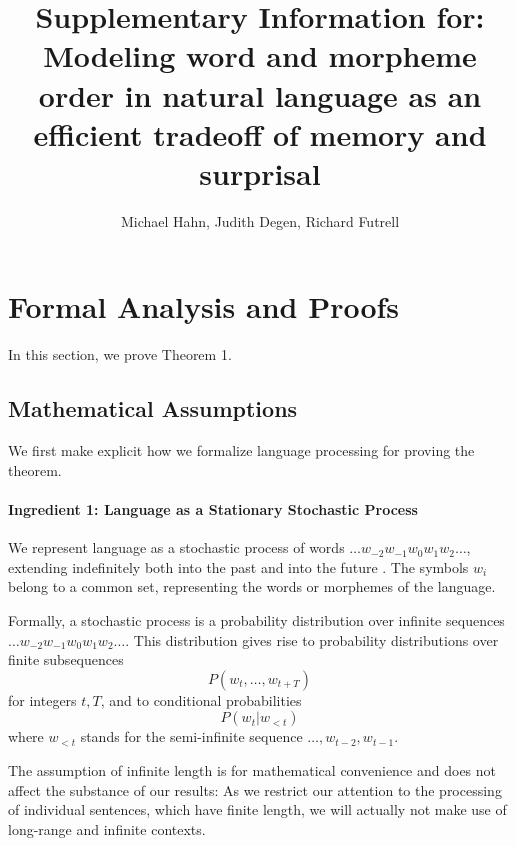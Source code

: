 \documentclass[11pt,letterpaper]{article}
\title{Supplementary Information for: Modeling word and morpheme order in natural language as an efficient tradeoff of memory and surprisal}
\author{Michael Hahn, Judith Degen, Richard Futrell}
\newcounter{theorem}
\begin{document}
\maketitle

\tableofcontents


%
%
%


\section{Formal Analysis and Proofs}

In this section, we prove Theorem 1.

\subsection{Mathematical Assumptions}

We first make explicit how we formalize language processing for proving the theorem.


\paragraph{Ingredient 1: Language as a Stationary Stochastic Process}
We represent language as a stochastic process of words $\dots w_{-2} w_{-1} w_0 w_{1} w_{2} \dots$, extending indefinitely both into the past and into the future \citep{karlin2014first}.
The symbols $w_i$ belong to a common set, representing the words or morphemes of the language.

Formally, a stochastic process is a probability distribution over infinite sequences $\dots w_{-2} w_{-1} w_0 w_{1} w_{2} \dots$.
This distribution gives rise to probability distributions over finite subsequences
\begin{equation}
	P(w_t, \dots, w_{t+T})
\end{equation}
for integers $t, T$, and to conditional probabilities
\begin{equation}
	P(w_t | w_{<t})
\end{equation}
where $w_{<t}$ stands for the semi-infinite sequence $\dots, w_{t-2}, w_{t-1}$.

The assumption of infinite length is for mathematical convenience and does not affect the substance of our results:
As we restrict our attention to the processing of individual sentences, which have finite length, we will actually not make use of long-range and infinite contexts.
\end{document}
